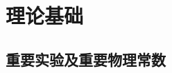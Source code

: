 \documentclass[12pt, a4paper, oneside, UTF8]{ctexbook}
\begin{document}
% 
\else
\fi
\part{理论基础}
\chapter{重要实验及重要物理常数}


















\ifx\allfiles\undefined
\end{document}
